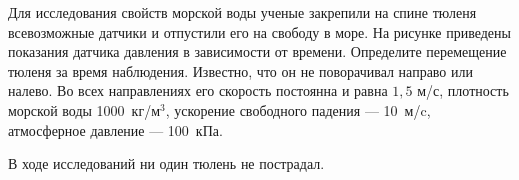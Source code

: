 Для исследования свойств морской воды ученые закрепили на спине тюленя всевозможные датчики и отпустили его на свободу в море. На рисунке приведены показания датчика давления в зависимости от времени. Определите перемещение тюленя за время наблюдения. Известно, что он не поворачивал направо или налево. Во всех направлениях его скорость постоянна и равна  $1{,}5$ м/с, плотность морской воды 1000~кг/м$^3$, ускорение свободного падения --- 10~м/c, атмосферное давление --- 100~кПа.

В ходе исследований ни один тюлень не пострадал.